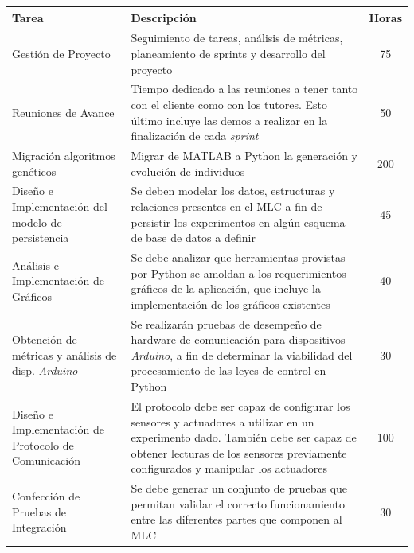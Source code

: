 \documentclass[a4paper,10pt]{article}
\begin{document}
        \begin{center}
        \hspace*{-1.5cm}
        \begin{longtable}{|p{3.5cm}|p{7cm}|c|}
            \hline
            \textbf{Tarea} & \textbf{Descripción} & \textbf{Horas} \\
            \hline
            Gestión de Proyecto & Seguimiento de tareas, análisis de métricas, planeamiento de sprints y
            desarrollo del proyecto & 75 \\
            \hline
            Reuniones de Avance & Tiempo dedicado a las reuniones a tener tanto con el cliente como con los tutores. Esto último incluye
            las demos a realizar en la finalización de cada \textit{sprint} & 50 \\
            \hline
            Migración algoritmos genéticos & Migrar de MATLAB a Python la generación y evolución de individuos & 200 \\
            \hline
            Diseño e Implementación del modelo de persistencia & Se deben modelar los datos, estructuras y relaciones presentes en el MLC a 
            fin de persistir los experimentos en algún esquema de base de datos a definir & 45 \\
            \hline
            Análisis e Implementación de Gráficos & Se debe analizar que herramientas provistas por Python se amoldan a los requerimientos
            gráficos de la aplicación, que incluye la implementación de los gráficos existentes & 40 \\
            \hline
            Obtención de métricas y análisis de disp. \textit{Arduino} & Se realizarán pruebas de desempeño de hardware de comunicación
            para dispositivos \textit{Arduino}, a fin de determinar la viabilidad del procesamiento de las leyes de control en Python
            & 30 \\
            \hline
            Diseño e Implementación de Protocolo de Comunicación & El protocolo debe ser capaz de configurar los sensores y actuadores
            a utilizar en un experimento dado. También debe ser capaz de obtener lecturas de los sensores previamente configurados y
            manipular los actuadores & 100 \\
            \hline
            Confección de Pruebas de Integración & Se debe generar un conjunto de pruebas que permitan validar el correcto funcionamiento
            entre las diferentes partes que componen al MLC & 30 \\
            \hline

\end{longtable}
\end{center}
\end{document}
